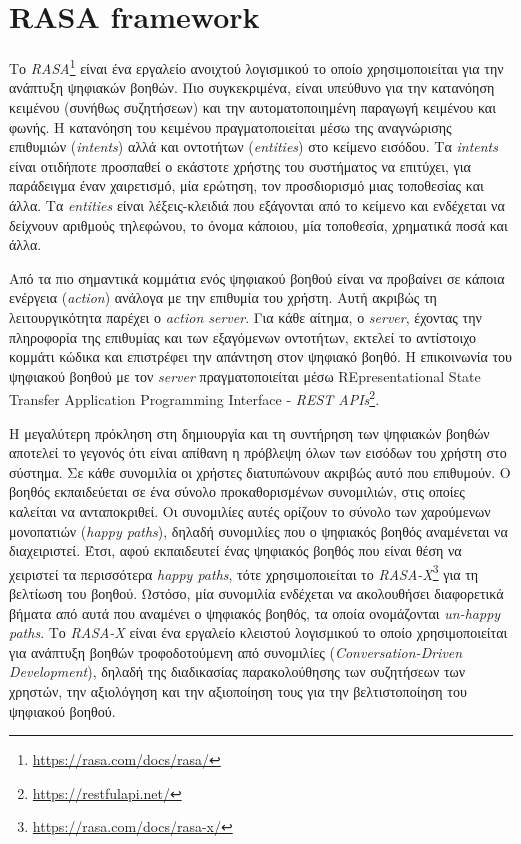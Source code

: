 \section{RASA framework}
\label{sec:rasa}
Το \emph{RASA}\footnote{\url{https://rasa.com/docs/rasa/}} είναι ένα εργαλείο ανοιχτού λογισμικού το οποίο χρησιμοποιείται για την ανάπτυξη ψηφιακών βοηθών. Πιο συγκεκριμένα, είναι υπεύθυνο για την κατανόηση κειμένου (συνήθως συζητήσεων) και την αυτοματοποιημένη παραγωγή κειμένου και φωνής. Η κατανόηση του κειμένου πραγματοποιείται μέσω της αναγνώρισης επιθυμιών (\emph{intents}) αλλά και οντοτήτων (\emph{entities}) στο κείμενο εισόδου. Τα \emph{intents} είναι οτιδήποτε προσπαθεί ο εκάστοτε χρήστης του συστήματος να επιτύχει, για παράδειγμα έναν χαιρετισμό, μία ερώτηση, τον προσδιορισμό μιας τοποθεσίας και άλλα. Τα \emph{entities} είναι λέξεις-κλειδιά που εξάγονται από το κείμενο και ενδέχεται να δείχνουν αριθμούς τηλεφώνου, το όνομα κάποιου, μία τοποθεσία, χρηματικά ποσά και άλλα. 

Από τα πιο σημαντικά κομμάτια ενός ψηφιακού βοηθού είναι να προβαίνει σε κάποια ενέργεια (\emph{action}) ανάλογα με την επιθυμία του χρήστη. Αυτή ακριβώς τη λειτουργικότητα παρέχει ο \emph{action server}. Για κάθε αίτημα, ο \emph{server}, έχοντας την πληροφορία της επιθυμίας και των εξαγόμενων οντοτήτων, εκτελεί το αντίστοιχο κομμάτι κώδικα και επιστρέφει την απάντηση στον ψηφιακό βοηθό. Η επικοινωνία του ψηφιακού βοηθού με τον \emph{server} πραγματοποιείται μέσω REpresentational State Transfer Application Programming Interface - \emph{REST APIs}\footnote{\url{https://restfulapi.net/}}.

Η μεγαλύτερη πρόκληση στη δημιουργία και τη συντήρηση των ψηφιακών βοηθών αποτελεί το γεγονός ότι είναι απίθανη η πρόβλεψη όλων των εισόδων του χρήστη στο σύστημα. Σε κάθε συνομιλία οι χρήστες διατυπώνουν ακριβώς αυτό που επιθυμούν. Ο βοηθός εκπαιδεύεται σε ένα σύνολο προκαθορισμένων συνομιλιών, στις οποίες καλείται να ανταποκριθεί. Οι συνομιλίες αυτές ορίζουν το σύνολο των χαρούμενων μονοπατιών (\emph{happy paths}), δηλαδή συνομιλίες που ο ψηφιακός βοηθός αναμένεται να διαχειριστεί. Έτσι, αφού εκπαιδευτεί ένας ψηφιακός βοηθός που είναι θέση να χειριστεί τα περισσότερα \emph{happy paths}, τότε χρησιμοποιείται το \emph{RASA-X}\footnote{\url{https://rasa.com/docs/rasa-x/}} για τη βελτίωση του βοηθού. Ωστόσο, μία συνομιλία ενδέχεται να ακολουθήσει διαφορετικά βήματα από αυτά που αναμένει ο ψηφιακός βοηθός, τα οποία ονομάζονται \emph{un-happy paths}. Το \emph{RASA-X} είναι ένα εργαλείο κλειστού λογισμικού το οποίο χρησιμοποιείται για ανάπτυξη βοηθών τροφοδοτούμενη από συνομιλίες (\emph{Conversation-Driven Development}), δηλαδή της διαδικασίας παρακολούθησης των συζητήσεων των χρηστών, την αξιολόγηση και την αξιοποίηση τους για την βελτιστοποίηση του ψηφιακού βοηθού. 

